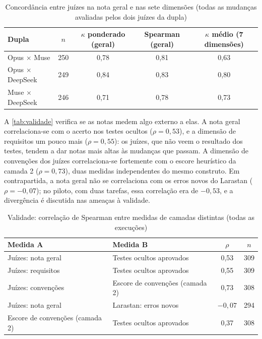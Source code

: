\begin{table}[htb]
    \centering
    \ABNTEXfontereduzida
    \caption{Concordância entre juízes na nota geral e nas sete dimensões (todas as mudanças avaliadas pelos dois juízes da dupla)}
    \label{tab:kappa}
    \begin{tabular}{lcccc}
        \toprule
        \textbf{Dupla} & $n$ & $\kappa$ ponderado (geral) & Spearman (geral) & $\kappa$ médio (7 dimensões) \\
        \midrule
        Opus $\times$ Muse & 250 & 0,78 & 0,81 & 0,63 \\
        Opus $\times$ DeepSeek & 249 & 0,84 & 0,83 & 0,80 \\
        Muse $\times$ DeepSeek & 246 & 0,71 & 0,78 & 0,73 \\
        \bottomrule
    \end{tabular}
    \fonteautor
\end{table}

A \autoref{tab:validade} verifica se as notas medem algo externo a elas. A nota
geral correlaciona-se com o acerto nos testes ocultos ($\rho = 0{,}53$), e a
dimensão de requisitos um pouco mais ($\rho = 0{,}55$): os juízes, que não veem
o resultado dos testes, tendem a dar notas mais altas às mudanças que passam.
A dimensão de convenções dos juízes correlaciona-se fortemente com o escore
heurístico da camada 2 ($\rho = 0{,}73$), duas medidas independentes do mesmo
construto. Em contrapartida, a nota geral não se correlaciona com os erros novos
do Larastan ($\rho = -0{,}07$); no piloto, com duas tarefas, essa correlação era
de $-0{,}53$, e a divergência é discutida nas ameaças à validade.

\begin{table}[htb]
    \centering
    \ABNTEXfontereduzida
    \caption{Validade: correlação de Spearman entre medidas de camadas distintas (todas as execuções)}
    \label{tab:validade}
    \begin{tabular}{llcc}
        \toprule
        \textbf{Medida A} & \textbf{Medida B} & $\rho$ & $n$ \\
        \midrule
        Juízes: nota geral & Testes ocultos aprovados & 0,53 & 309 \\
        Juízes: requisitos & Testes ocultos aprovados & 0,55 & 309 \\
        Juízes: convenções & Escore de convenções (camada 2) & 0,73 & 308 \\
        Juízes: nota geral & Larastan: erros novos & $-0{,}07$ & 294 \\
        Escore de convenções (camada 2) & Testes ocultos aprovados & 0,37 & 308 \\
        \bottomrule
    \end{tabular}
    \fonteautor
\end{table}

